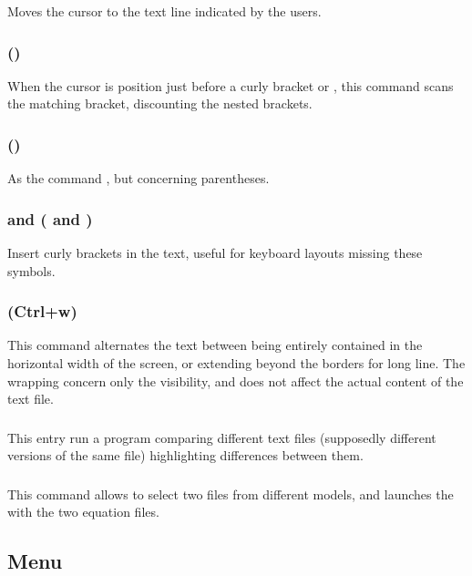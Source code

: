 \documentclass [11pt,a4paper] {book}
\begin{document}
Moves the cursor to the text line indicated by the users. 

\subsubsection{ ()}

When the cursor is position just before a curly bracket \code{\{} or \code{\}}, this command scans the matching bracket, discounting the nested brackets.


\subsubsection{ ()}
As the command , but concerning parentheses.

\subsubsection{ and  ( and ) }

Insert curly brackets in the text, useful for keyboard layouts missing these symbols.

\subsubsection{ (Ctrl+w)}

This command alternates the text between being entirely contained in the horizontal width of the screen, or extending beyond the borders for long line. The wrapping concern only the visibility, and does not affect the actual content of the text file.

\subsubsection{ }

This entry run a program comparing different text files (supposedly different versions of the same file) highlighting differences between them.

\subsubsection{}
This command allows to select two files from different models, and launches the  with the two equation files.

\subsection{Menu }
\end{document}
